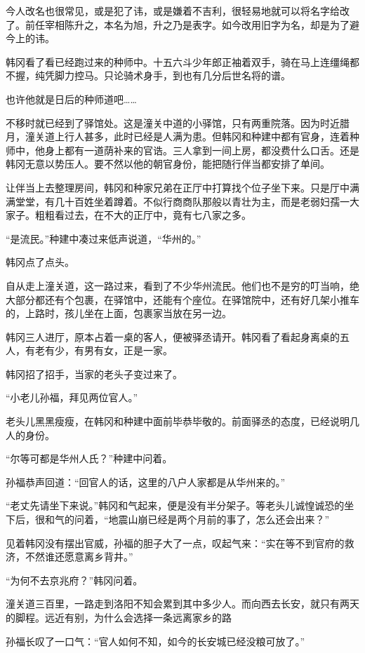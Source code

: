 今人改名也很常见，或是犯了讳，或是嫌着不吉利，很轻易地就可以将名字给改了。前任宰相陈升之，本名为旭，升之乃是表字。如今改用旧字为名，却是为了避今上的讳。

韩冈看了看已经跑过来的种师中。十五六斗少年郎正袖着双手，骑在马上连缰绳都不握，纯凭脚力控马。只论骑术身手，到也有几分后世名将的谱。

也许他就是日后的种师道吧……

不移时就已经到了驿馆处。这是潼关中道的小驿馆，只有两重院落。因为时近腊月，潼关道上行人甚多，此时已经是人满为患。但韩冈和种建中都有官身，连着种师中，他身上都有一道荫补来的官诰。三人拿到一间上房，都没费什么口舌。还是韩冈无意以势压人。要不然以他的朝官身份，能把随行伴当都安排了单间。

让伴当上去整理房间，韩冈和种家兄弟在正厅中打算找个位子坐下来。只是厅中满满堂堂，有几十百姓坐着蹲着。不似行商商队那般以青壮为主，而是老弱妇孺一大家子。粗粗看过去，在不大的正厅中，竟有七八家之多。

“是流民。”种建中凑过来低声说道，“华州的。”

韩冈点了点头。

自从走上潼关道，这一路过来，看到了不少华州流民。他们也不是穷的叮当响，绝大部分都还有个包裹，在驿馆中，还能有个座位。在驿馆院中，还有好几架小推车的，上路时，孩儿坐在上面，包裹家当放在另一边。

韩冈三人进厅，原本占着一桌的客人，便被驿丞请开。韩冈看了看起身离桌的五人，有老有少，有男有女，正是一家。

韩冈招了招手，当家的老头子变过来了。

“小老儿孙福，拜见两位官人。”

老头儿黑黑瘦瘦，在韩冈和种建中面前毕恭毕敬的。前面驿丞的态度，已经说明几人的身份。

“尔等可都是华州人氏？”种建中问着。

孙福恭声回道：“回官人的话，这里的八户人家都是从华州来的。”

“老丈先请坐下来说。”韩冈和气起来，便是没有半分架子。等老头儿诚惶诚恐的坐下后，很和气的问着，“地震山崩已经是两个月前的事了，怎么还会出来？”

见着韩冈没有摆出官威，孙福的胆子大了一点，叹起气来：“实在等不到官府的救济，不然谁还愿意离乡背井。”

“为何不去京兆府？”韩冈问着。

潼关道三百里，一路走到洛阳不知会累到其中多少人。而向西去长安，就只有两天的脚程。远近有别，为什么会选择一条远离家乡的路

孙福长叹了一口气：“官人如何不知，如今的长安城已经没粮可放了。”

